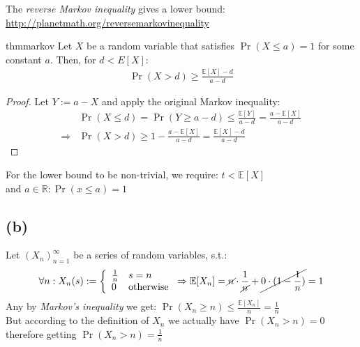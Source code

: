 \documentclass[a4paper]{article}
\newcommand{\lc}{\left\{}
\newcommand{\E}{\mathbb{E}}
\newcommand{\qedsquare}{\tag*{$\square$}}
\begin{document}
The \textit{reverse Markov inequality} gives a lower bound: \\
\url{http://planetmath.org/reversemarkovinequality}
\begin{restatable}{thm}{markov}
    \label{thm:markov}
    Let $X$ be a random variable that satisfies $ \Pr(X \leq a) = 1 $ for some constant $a$.
    Then, for $ d < E[X] $:
    \begin{align*}
        \Pr(X>d) \geq \frac{\E[X] - d}{a - d}
    \end{align*}
\end{restatable}
\begin{proof}
    Let $Y:=a-X$ and apply the original Markov inequality:
    \begin{align*}
        &\Pr(X\leq d) = \Pr(Y\geq a-d) 
        \leq \frac{\E[Y]}{a-d} 
        = \frac{a-\E[X]}{a-d} \\
        \Rightarrow &\Pr(X>d) \geq 1 - \frac{a-\E[X]}{a-d} = \frac{\E[X]-d}{a-d}
    \end{align*}
\end{proof}

For the lower bound to be non-trivial, we require: $t<\E[X]$ \\
and $ a\in\mathbb{R} : \Pr(x \leq a) = 1 $

\subsection {(b)}

Let $(X_n)_{n=1}^{\infty}$ be a series of random variables, s.t.:\\
\begin{align*}
    \forall n: X_n (s) := \lc
    \begin{array}{ll}
        \frac{1}{n} & \mbox{$s=n$} \\
        0 & \mbox{otherwise}
    \end{array} \right.
    \Rightarrow \E[X_n] = \cancel{n} \cdot \frac{1}{\cancel{n}} + \cancel{0 \cdot (1 - \frac{1}{n})} = 1 \\
\end{align*}
Any by \textit{Markov's inequality} we get: $ \Pr(X_n \geq n) \leq \displaystyle \frac{\E[X_n]}{n} = \frac{1}{n} $ \\
But according to the definition of $X_n$ we actually have $\Pr(X_n>n)=0$ therefore getting $\Pr(X_n>n)=\frac{1}{n}$ \\
\begin{align*}\qedsquare\end{align*}
\end{document}
